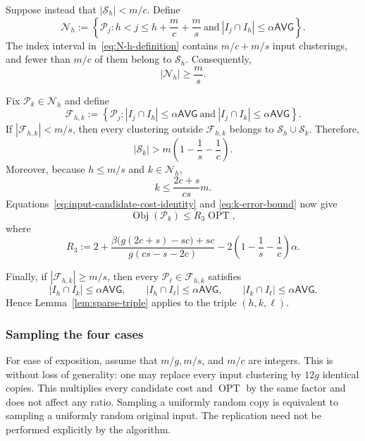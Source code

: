 \documentclass[11pt]{article}
\theoremstyle{definition}
\theoremstyle{remark}
\newcommand{\F}{\mathcal F}
\newcommand{\N}{\mathcal N}
\newcommand{\Pp}{\mathcal P}
\newcommand{\Sset}{\mathcal S}
\newcommand{\OPT}{\operatorname{OPT}}
\newcommand{\Obj}{\operatorname{Obj}}
\newcommand{\1}{\mathbf 1}
\begin{document}
Suppose instead that $|\Sset_h|<m/c$.  Define
\begin{equation}\label{eq:N-h-definition}
 \N_h
 :=
 \left\{
 \Pp_j:
 h<j\le h+\frac{m}{c}+\frac{m}{s}
 \ \text{and}\ 
 |I_j\cap I_h|\le\alpha\mathsf{AVG}
 \right\}.
\end{equation}
The index interval in~\eqref{eq:N-h-definition} contains
$m/c+m/s$ input clusterings, and fewer than $m/c$ of them belong to
$\Sset_h$.  Consequently,
\begin{equation}\label{eq:N-h-size}
 |\N_h|\ge\frac{m}{s}.
\end{equation}

Fix $\Pp_k\in\N_h$ and define
\begin{equation}\label{eq:F-hk-definition}
 \F_{h,k}
 :=
 \left\{
 \Pp_j:
 |I_j\cap I_h|\le\alpha\mathsf{AVG}
 \ \text{and}\ 
 |I_j\cap I_k|\le\alpha\mathsf{AVG}
 \right\}.
\end{equation}
If $|\F_{h,k}|<m/s$, then every clustering outside $\F_{h,k}$ belongs to
$\Sset_h\cup\Sset_k$.  Therefore,
\begin{equation}\label{eq:S-k-size}
 |\Sset_k|
 >m\left(1-\frac1s-\frac1c\right).
\end{equation}
Moreover, because $h\le m/s$ and $k\in\N_h$,
\[
 k\le\frac{2c+s}{cs}m.
\]
Equations~\eqref{eq:input-candidate-cost-identity} and
\eqref{eq:k-error-bound} now give
\begin{equation}\label{eq:R3-bound}
 \Obj(\Pp_k)
 \le R_3\OPT,
\end{equation}
where
\begin{equation}\label{eq:R3-definition}
 R_3
 :=
 2+
 \frac{\beta\bigl(g(2c+s)-sc\bigr)+sc}
      {g(cs-s-2c)}
 -2\left(1-\frac1s-\frac1c\right)\alpha.
\end{equation}

Finally, if $|\F_{h,k}|\ge m/s$, then every
$\Pp_\ell\in\F_{h,k}$ satisfies
\[
 |I_h\cap I_k|\le\alpha\mathsf{AVG},\qquad
 |I_h\cap I_\ell|\le\alpha\mathsf{AVG},\qquad
 |I_k\cap I_\ell|\le\alpha\mathsf{AVG}.
\]
Hence Lemma~\ref{lem:sparse-triple} applies to the triple
$(h,k,\ell)$.

\subsubsection{Sampling the four cases}

For ease of exposition, assume that $m/g,m/s$, and $m/c$ are integers.
This is without loss of generality: one may replace every input clustering
by $12g$ identical copies.  This multiplies every candidate cost and
$\OPT$ by the same factor and does not affect any ratio.  Sampling a
uniformly random copy is equivalent to sampling a uniformly random original
input.  The replication need not be performed explicitly by the algorithm.
\end{document}
